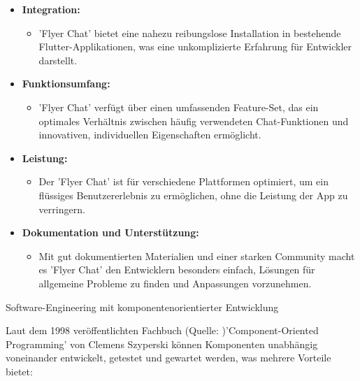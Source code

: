 \begin{itemize}
  \item \textbf{Integration:}
        \begin{itemize}
          \item {'Flyer Chat' bietet eine nahezu reibungslose Installation in bestehende Flutter-Applikationen, was eine unkomplizierte Erfahrung für Entwickler darstellt.}
        \end{itemize}
  \item \textbf{Funktionsumfang:}
        \begin{itemize}
          \item {'Flyer Chat' verfügt über einen umfassenden Feature-Set, das ein optimales Verhältnis zwischen häufig verwendeten Chat-Funktionen und innovativen, individuellen Eigenschaften ermöglicht.}
        \end{itemize}
  \item \textbf{Leistung:}
        \begin{itemize}
          \item {Der 'Flyer Chat' ist für verschiedene Plattformen optimiert, um ein flüssiges Benutzererlebnis zu ermöglichen, ohne die Leistung der App zu verringern.}
        \end{itemize}
  \item \textbf{Dokumentation und Unterstützung:}
        \begin{itemize}
          \item {Mit gut dokumentierten Materialien und einer starken Community macht es 'Flyer Chat' den Entwicklern besonders einfach, Lösungen für allgemeine Probleme zu finden und Anpassungen vorzunehmen.}
        \end{itemize}
\end{itemize}

Software-Engineering mit komponentenorientierter Entwicklung

Laut dem 1998 veröffentlichten Fachbuch (Quelle: \cite{szyperski-component} )'Component-Oriented Programming' von Clemens Szyperski können Komponenten unabhängig voneinander entwickelt, getestet und gewartet werden, was mehrere Vorteile bietet:

